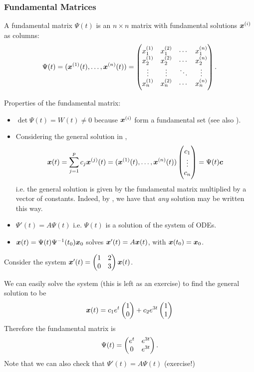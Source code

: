 \subsubsection{Fundamental Matrices}

\begin{definition}
	A fundamental matrix $\Psi(t)$ is an $n \times n$ matrix with fundamental solutions $\bm{x}^{(i)}$ as columns:
	\[
		\Psi(t) = (\bm{x}^{(1)}(t), \ldots, \bm{x}^{(n)}(t)) = \begin{pmatrix}x_1^{(1)} & x_1^{(2)} & \cdots & x_1^{(n)} \\ x_2^{(1)} & x_2^{(2)} & \cdots & x_2^{(n)} \\ \vdots & \vdots & \ddots & \vdots \\ x_n^{(1)} & x_n^{(2)} & \cdots & x_n^{(n)}\end{pmatrix}.
	\]
\end{definition}

Properties of the fundamental matrix:
\begin{itemize}
	\item $\det \Psi(t) = W(t) \neq 0$ because $\bm{x}^{(i)}$ form a fundamental set (see also ).
	\item{Considering the general solution in ,
		\begin{align*}
			\bm{x}(t) = \sum_{j=1}^p c_j \bm{x}^{(j)}(t) = (\bm{x}^{(1)}(t), \ldots, \bm{x}^{(n)}(t)) \begin{pmatrix}c_1 \\ \vdots \\ c_n\end{pmatrix} = \Psi(t) \bm{c}
		\end{align*}
		i.e. the general solution is given by the fundamental matrix multiplied by a vector of constants. Indeed, by , we have that \emph{any} solution may be written this way.}
	\item $\Psi'(t) = A \Psi(t)$ i.e. $\Psi(t)$ is a solution of the system of ODEs.
	\item $\bm{x}(t) = \Psi(t) \Psi^{-1}(t_0) \bm{x}_0$ solves $\bm{x}'(t) = A\bm{x}(t)$, with $\bm{x}(t_0) = \bm{x}_0$.
\end{itemize}

\begin{eg}\label{eg:fundamentalmatrix}
	Consider the system $\bm{x}'(t) = \begin{pmatrix}1 & 2 \\ 0 & 3\end{pmatrix} \bm{x}(t)$.
	
	We can easily solve the system (this is left as an exercise) to find the general solution to be
	\[
	\bm{x}(t) = c_1 e^t \begin{pmatrix}1 \\ 0\end{pmatrix} + c_2 e^{3t} \begin{pmatrix}1 \\ 1\end{pmatrix}
	\]
	Therefore the fundamental matrix is
	\[
	\Psi(t) = \begin{pmatrix}e^t & e^{3t} \\ 0 & e^{3t}\end{pmatrix}.
	\]
	Note that we can also check that $\Psi'(t) = A\Psi(t)$ (exercise!)
\end{eg}


